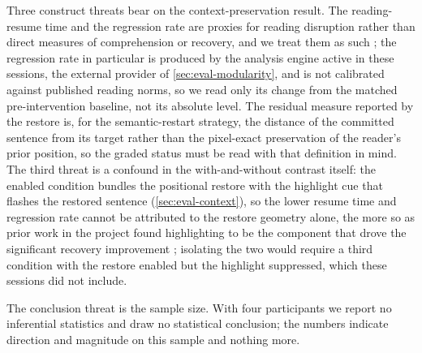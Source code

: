 Three construct threats bear on the context-preservation result.
The reading-resume time and the regression rate are proxies for reading disruption rather than direct measures of comprehension or recovery, and we treat them as such \cite{rayner1998eyemovements}; the regression rate in particular is produced by the analysis engine active in these sessions, the external provider of \cref{sec:eval-modularity}, and is not calibrated against published reading norms, so we read only its change from the matched pre-intervention baseline, not its absolute level.
The residual measure reported by the restore is, for the semantic-restart strategy, the distance of the committed sentence from its target rather than the pixel-exact preservation of the reader's prior position, so the graded status must be read with that definition in mind.
The third threat is a confound in the with-and-without contrast itself: the enabled condition bundles the positional restore with the highlight cue that flashes the restored sentence (\cref{sec:eval-context}), so the lower resume time and regression rate cannot be attributed to the restore geometry alone, the more so as prior work in the project found highlighting to be the component that drove the significant recovery improvement \cite{jensen2025context}; isolating the two would require a third condition with the restore enabled but the highlight suppressed, which these sessions did not include.

The conclusion threat is the sample size.
With four participants we report no inferential statistics and draw no statistical conclusion; the numbers indicate direction and magnitude on this sample and nothing more.
